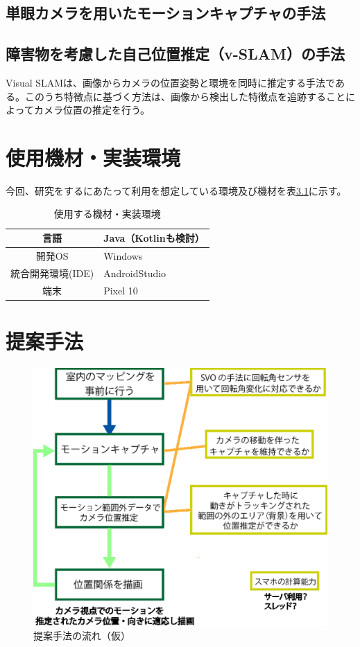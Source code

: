 \documentclass[11pt]{jreport}
\begin{document}
\section{単眼カメラを用いたモーションキャプチャの手法}


\section{障害物を考慮した自己位置推定（v-SLAM）の手法}
Visual SLAMは、画像からカメラの位置姿勢と環境を同時に推定する手法である。このうち特徴点に基づく方法は、画像から検出した特徴点を追跡することによってカメラ位置の推定を行う。

\chapter{使用機材・実装環境}
今回、研究をするにあたって利用を想定している環境及び機材を表\ref{jikkoukannkyou}に示す。

\begin{center}
\begin{table}[H]
\caption{使用する機材・実装環境}
\label{jikkoukannkyou}
\center
\begin{tabular}{|c||l|} \hline
言語 & Java（Kotlinも検討） \\ \hline 
開発OS & Windows  \\ \hline
統合開発環境(IDE) & AndroidStudio \\ \hline
端末 & Pixel 10 \\ \hline
\end{tabular}
\end{table}
\end{center}

\chapter{提案手法}\label{chap:fig-tab-exp}

\begin{figure}[htbp]
  \centering
  \includegraphics[scale = 0.5]{memo1.eps}
  \caption{提案手法の流れ（仮）}
  \label{shuhoufig1}
\end{figure}
\end{document}
